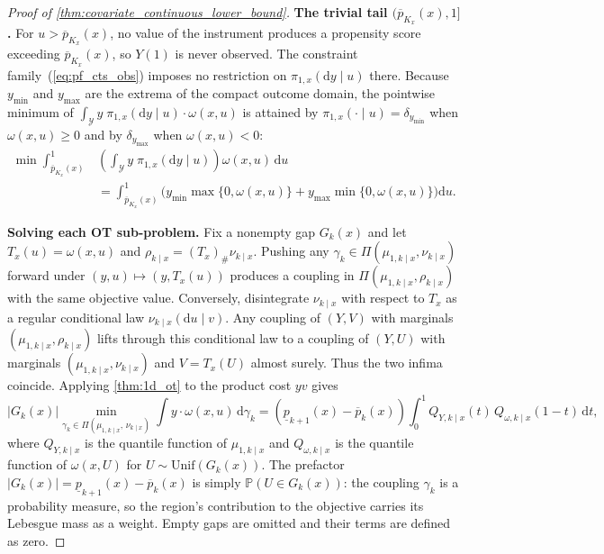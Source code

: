 \begin{proof}[Proof of \cref{thm:covariate_continuous_lower_bound}]
\medskip
\noindent\textbf{The trivial tail $(\overline{p}_{K_x}(x), 1]$.}
For $u > \overline{p}_{K_x}(x)$, no value of the instrument produces a propensity score exceeding $\overline{p}_{K_x}(x)$, so $Y(1)$ is never observed. The constraint family~(\ref{eq:pf_cts_obs}) imposes no restriction on $\pi_{1,x}(\mathrm{d}y \mid u)$ there. Because $y_{\min}$ and $y_{\max}$ are the extrema of the compact outcome domain, the pointwise minimum of $\int_{\mathcal{Y}} y\;\pi_{1,x}(\mathrm{d}y \mid u) \cdot \omega(x,u)$ is attained by $\pi_{1,x}(\cdot \mid u) = \delta_{y_{\min}}$ when $\omega(x,u) \geqslant 0$ and by $\delta_{y_{\max}}$ when $\omega(x,u) < 0$:
\begin{equation}\label{eq:pf_cts_trivial}
    \begin{split}
        \min \int_{\overline{p}_{K_x}(x)}^{1} & \left(\int_{\mathcal{Y}} y\;\pi_{1,x}(\mathrm{d}y \mid u)\right)\omega(x, u)\,\mathrm{d}u \\
        & = \int_{\overline{p}_{K_x}(x)}^{1} \Big( y_{\min}\max\{0,\omega(x,u)\} + y_{\max}\min\{0,\omega(x,u)\} \Big)\mathrm{d}u.
    \end{split}
\end{equation}

\medskip
\noindent\textbf{Solving each OT sub-problem.}
Fix a nonempty gap $G_k(x)$ and let $T_x(u)=\omega(x,u)$ and $\rho_{k\mid x}=(T_x)_{\#}\nu_{k\mid x}$. Pushing any $\gamma_k\in\Pi(\mu_{1,k\mid x},\nu_{k\mid x})$ forward under $(y,u)\mapsto(y,T_x(u))$ produces a coupling in $\Pi(\mu_{1,k\mid x},\rho_{k\mid x})$ with the same objective value. Conversely, disintegrate $\nu_{k\mid x}$ with respect to $T_x$ as a regular conditional law $\nu_{k\mid x}(\mathrm du\mid v)$. Any coupling of $(Y,V)$ with marginals $(\mu_{1,k\mid x},\rho_{k\mid x})$ lifts through this conditional law to a coupling of $(Y,U)$ with marginals $(\mu_{1,k\mid x},\nu_{k\mid x})$ and $V=T_x(U)$ almost surely. Thus the two infima coincide. Applying \cref{thm:1d_ot} to the product cost $y v$ gives
\begin{equation}\label{eq:pf_cts_ot_sol}
    |G_k(x)|\min_{\gamma_k \in \Pi(\mu_{1,k\mid x},\, \nu_{k\mid x})} \int y \cdot \omega(x,u)\,\mathrm{d}\gamma_k = (\underline{p}_{k+1}(x)-\overline{p}_k(x))\int_0^1 Q_{Y,k\mid x}(t)\,Q_{\omega,k\mid x}(1-t)\,\mathrm{d}t,
\end{equation}
where $Q_{Y,k\mid x}$ is the quantile function of $\mu_{1,k\mid x}$ and $Q_{\omega,k\mid x}$ is the quantile function of $\omega(x, U)$ for $U \sim \mathrm{Unif}(G_k(x))$. The prefactor $|G_k(x)| = \underline{p}_{k+1}(x)-\overline{p}_k(x)$ is simply $\mathbb{P}(U \in G_k(x))$: the coupling $\gamma_k$ is a probability measure, so the region's contribution to the objective carries its Lebesgue mass as a weight. Empty gaps are omitted and their terms are defined as zero.


\end{proof}
